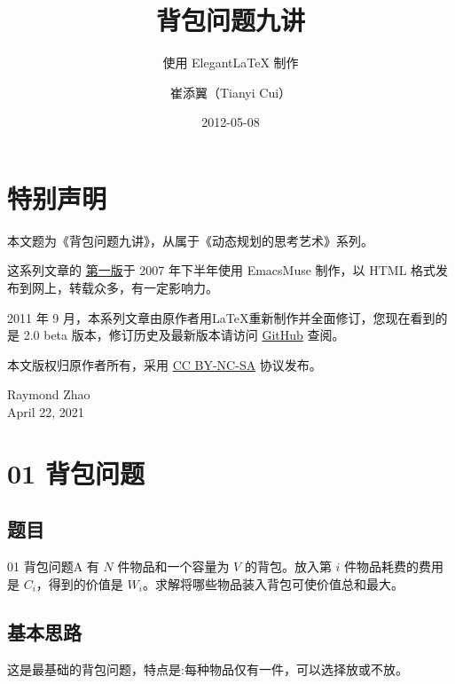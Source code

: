 \documentclass[cn, 11pt, chinese, toc=twocol]{elegantbook}
\title{背包问题九讲}
\subtitle{使用 Elegant\LaTeX{} 制作}
\author{崔添翼（Tianyi Cui）}
\date{2012-05-08}
\begin{document}
\maketitle
\frontmatter

\chapter*{特别声明}

本文题为《背包问题九讲》，从属于《动态规划的思考艺术》系列。

这系列文章的 \href{http://love-oriented.com/pack/}{第一版}于 2007 年下半年使用 EmacsMuse 制作，以 HTML 格式发布到网上，转载众多，有一定影响力。

2011 年 9 月，本系列文章由原作者用\LaTeX{}重新制作并全面修订，您现在看到的是 2.0 beta 版本，修订历史及最新版本请访问 \href{https://github.com/tianyicui/pack}{GitHub} 查阅。

本文版权归原作者所有，采用 \href{https://creativecommons.org/licenses/by-nc-sa/3.0/}{CC BY-NC-SA} 协议发布。

\vskip 1.5cm

\begin{flushright}
Raymond Zhao\\
April 22, 2021
\end{flushright}

\tableofcontents
\hypersetup{pageanchor=true} %

\mainmatter
\chapter{01 背包问题}

\section{题目}

\begin{definition}{01 背包问题}{A}
  有 $N$ 件物品和一个容量为 $V$ 的背包。放入第 $i$ 件物品耗费的费用是 $C_i$，得到的价值是 $W_i$。求解将哪些物品装入背包可使价值总和最大。
\end{definition}

\section{基本思路}

这是最基础的背包问题，特点是:每种物品仅有一件，可以选择放或不放。
\end{document}
